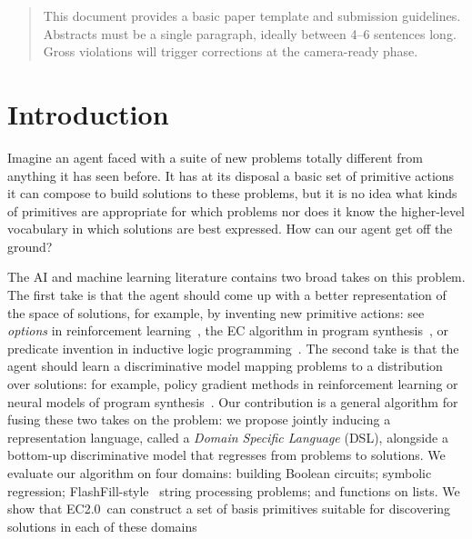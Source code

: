 \documentclass{article}
\newcommand{\system}{EC2.0~}
\begin{document}
\printAffiliationsAndNotice{\icmlEqualContribution} %

\begin{abstract}
This document provides a basic paper template and submission guidelines.
Abstracts must be a single paragraph, ideally between 4--6 sentences long.
Gross violations will trigger corrections at the camera-ready phase.
\end{abstract}

\section{Introduction}

Imagine an agent faced with a suite of new problems totally different
from anything it has seen before. It has at its disposal a basic set
of primitive actions it can compose to build solutions to these problems, but
it is no idea what kinds of primitives are appropriate for which
problems nor does it know the higher-level vocabulary in
which solutions are best expressed.
How can our agent get off the ground?

The AI and machine learning literature contains two broad takes on this problem.
The first take is that the agent should come up with a better representation of the space of solutions,
for example, by inventing new primitive actions: see \emph{options} in reinforcement learning~\cite{stolle2002learning}, the EC algorithm in program synthesis~\cite{Dechter:2013:BLV:2540128.2540316}, or predicate invention in inductive logic programming~\cite{muggleton2015meta}.
The second take is that the agent should learn a discriminative model mapping problems to a distribution over solutions: for example, policy gradient methods in reinforcement learning or neural models of program synthesis~\cite{devlin2017robustfill,balog2016deepcoder}.
Our contribution is a general algorithm for fusing these two takes on the problem:
we propose jointly inducing a representation language, called a \emph{Domain Specific Language} (DSL),
alongside a bottom-up discriminative model that regresses from problems to solutions.
We evaluate our algorithm on four domains:
building Boolean circuits; symbolic regression; FlashFill-style~\cite{gulwani2011automating} string processing problems; and functions on lists.
We show that \system can construct a set of basis primitives suitable for discovering solutions in each of these domains
\end{document}
